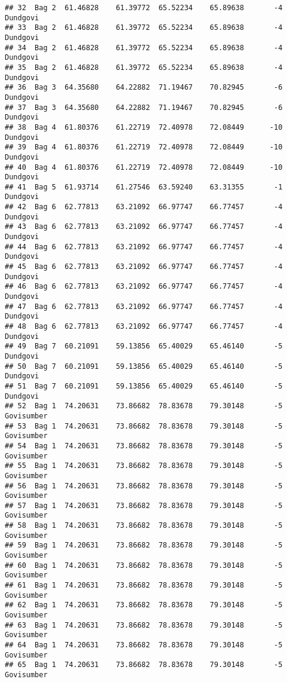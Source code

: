 \documentclass[
]{article}
\begin{document}
\begin{verbatim}
## 32  Bag 2  61.46828    61.39772  65.52234    65.89638       -4   Dundgovi
## 33  Bag 2  61.46828    61.39772  65.52234    65.89638       -4   Dundgovi
## 34  Bag 2  61.46828    61.39772  65.52234    65.89638       -4   Dundgovi
## 35  Bag 2  61.46828    61.39772  65.52234    65.89638       -4   Dundgovi
## 36  Bag 3  64.35680    64.22882  71.19467    70.82945       -6   Dundgovi
## 37  Bag 3  64.35680    64.22882  71.19467    70.82945       -6   Dundgovi
## 38  Bag 4  61.80376    61.22719  72.40978    72.08449      -10   Dundgovi
## 39  Bag 4  61.80376    61.22719  72.40978    72.08449      -10   Dundgovi
## 40  Bag 4  61.80376    61.22719  72.40978    72.08449      -10   Dundgovi
## 41  Bag 5  61.93714    61.27546  63.59240    63.31355       -1   Dundgovi
## 42  Bag 6  62.77813    63.21092  66.97747    66.77457       -4   Dundgovi
## 43  Bag 6  62.77813    63.21092  66.97747    66.77457       -4   Dundgovi
## 44  Bag 6  62.77813    63.21092  66.97747    66.77457       -4   Dundgovi
## 45  Bag 6  62.77813    63.21092  66.97747    66.77457       -4   Dundgovi
## 46  Bag 6  62.77813    63.21092  66.97747    66.77457       -4   Dundgovi
## 47  Bag 6  62.77813    63.21092  66.97747    66.77457       -4   Dundgovi
## 48  Bag 6  62.77813    63.21092  66.97747    66.77457       -4   Dundgovi
## 49  Bag 7  60.21091    59.13856  65.40029    65.46140       -5   Dundgovi
## 50  Bag 7  60.21091    59.13856  65.40029    65.46140       -5   Dundgovi
## 51  Bag 7  60.21091    59.13856  65.40029    65.46140       -5   Dundgovi
## 52  Bag 1  74.20631    73.86682  78.83678    79.30148       -5 Govisumber
## 53  Bag 1  74.20631    73.86682  78.83678    79.30148       -5 Govisumber
## 54  Bag 1  74.20631    73.86682  78.83678    79.30148       -5 Govisumber
## 55  Bag 1  74.20631    73.86682  78.83678    79.30148       -5 Govisumber
## 56  Bag 1  74.20631    73.86682  78.83678    79.30148       -5 Govisumber
## 57  Bag 1  74.20631    73.86682  78.83678    79.30148       -5 Govisumber
## 58  Bag 1  74.20631    73.86682  78.83678    79.30148       -5 Govisumber
## 59  Bag 1  74.20631    73.86682  78.83678    79.30148       -5 Govisumber
## 60  Bag 1  74.20631    73.86682  78.83678    79.30148       -5 Govisumber
## 61  Bag 1  74.20631    73.86682  78.83678    79.30148       -5 Govisumber
## 62  Bag 1  74.20631    73.86682  78.83678    79.30148       -5 Govisumber
## 63  Bag 1  74.20631    73.86682  78.83678    79.30148       -5 Govisumber
## 64  Bag 1  74.20631    73.86682  78.83678    79.30148       -5 Govisumber
## 65  Bag 1  74.20631    73.86682  78.83678    79.30148       -5 Govisumber

\end{verbatim}
\end{document}

